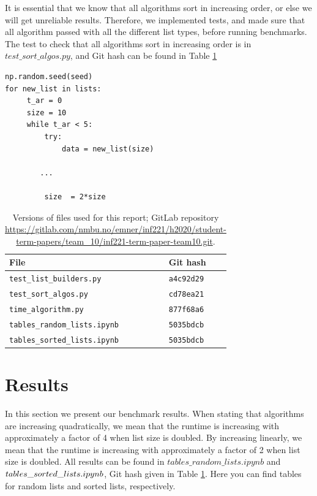 \documentclass[sigconf, nonacm, natbib, screen, balance=False]{acmart}
\begin{document}
It is essential that we know that all algorithms sort in increasing order, or else we will get unreliable results. Therefore, we implemented tests, and made sure that all algorithm passed with all the different list types, before running benchmarks. The test to check that all algorithms sort in increasing order is in $test\_sort\_algos.py$, and Git hash can be found in Table \ref{tab:hashes}


\begin{listing}[h!]
  \caption{Benchmark setup. For full bechmark setup, see githash in Table \ref{tab:hashes}}
  \label{lst:bench_setup}
  \begin{lstlisting}
np.random.seed(seed)
for new_list in lists:
     t_ar = 0
     size = 10
     while t_ar < 5:
         try:
             data = new_list(size)

		...

	     size  = 2*size
  \end{lstlisting}
\end{listing}
\FloatBarrier


\begin{table}[h!]
  \caption{Versions of files used for this report; GitLab repository
    \url{https://gitlab.com/nmbu.no/emner/inf221/h2020/student-term-papers/team_10/inf221-term-paper-team10.git}.}
  \label{tab:hashes}
  \begin{tabular}{ll}
    \hline
    File & Git hash \\\hline
    \verb!test_list_builders.py! & \verb!a4c92d29! \\
    \verb!test_sort_algos.py! & \verb!cd78ea21! \\
    \verb!time_algorithm.py! & \verb!877f68a6! \\
    \verb!tables_random_lists.ipynb! & \verb!5035bdcb! \\
    \verb!tables_sorted_lists.ipynb! & \verb!5035bdcb! \\
  \end{tabular}
\end{table}
\FloatBarrier

\section{Results}\label{sec:results}

In this section we present our benchmark results. When stating that algorithms are increasing quadratically, we mean that the runtime is increasing with approximately a factor of 4 when list size is doubled. By increasing linearly, we mean that the runtime is increasing with approximately a factor of 2 when list size is doubled.
All results can be found in $tables\_random\_lists.ipynb$ and $\\tables\_sorted\_lists.ipynb$, Git hash given in Table \ref{tab:hashes}. Here you can find tables for random lists and sorted lists, respectively. 
\end{document}
